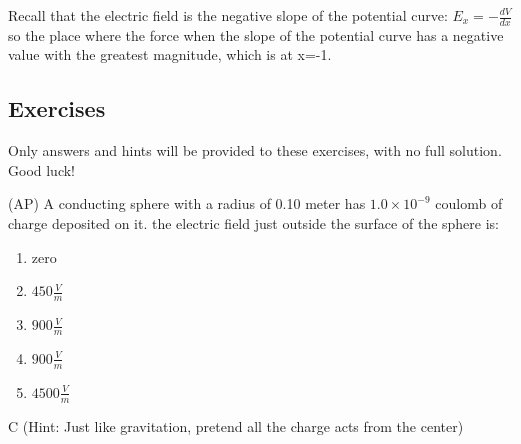 \begin{solution}

Recall that the electric field is the negative slope of the potential curve: $E_x=-\frac{dV}{dx}$ so the place where the force when the slope of the potential curve has a negative value with the greatest magnitude, which is at x=-1.
\end{solution}




\newpage
\subsection*{Exercises}
Only answers and hints will be provided to these exercises, with no full solution. Good luck!


\begin{question}
(AP) A conducting sphere with a radius of 0.10 meter has $1.0 \times 10^{-9}$ coulomb of charge deposited on it. the electric field just outside the surface of the sphere is:
\begin{multicols}{5}
\begin{enumerate}[label=(\alph*)]
    \item zero
    \item $450 \frac{V}{m}$
    \item $900 \frac{V}{m}$
    \item $900 \frac{V}{m}$
    \item $4500 \frac{V}{m}$
\end{enumerate}
\end{multicols}

\end{question}

\begin{solution}
C (Hint: Just like gravitation, pretend all the charge acts from the center)
\end{solution}


